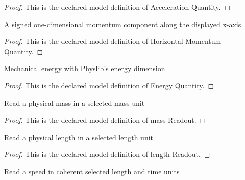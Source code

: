 \begin{proof}
  This is the declared model definition of Acceleration Quantity.
\end{proof}
\begin{definition}
  \label{def:physics:phyx-mini-0815:phyxminiproblems-problemphyxmini0815-horizontalmomentumquantity}
  A signed one-dimensional momentum component along the displayed x-axis
\end{definition}
\begin{proof}
  This is the declared model definition of Horizontal Momentum Quantity.
\end{proof}
\begin{definition}
  \label{def:physics:phyx-mini-0815:phyxminiproblems-problemphyxmini0815-energyquantity}
  Mechanical energy with Physlib's energy dimension
\end{definition}
\begin{proof}
  This is the declared model definition of Energy Quantity.
\end{proof}
\begin{definition}
  \label{def:physics:phyx-mini-0815:phyxminiproblems-problemphyxmini0815-massreadout}
  Read a physical mass in a selected mass unit
\end{definition}
\begin{proof}
  This is the declared model definition of mass Readout.
\end{proof}
\begin{definition}
  \label{def:physics:phyx-mini-0815:phyxminiproblems-problemphyxmini0815-lengthreadout}
  Read a physical length in a selected length unit
\end{definition}
\begin{proof}
  This is the declared model definition of length Readout.
\end{proof}
\begin{definition}
  \label{def:physics:phyx-mini-0815:phyxminiproblems-problemphyxmini0815-speedreadout}
  Read a speed in coherent selected length and time units
\end{definition}
